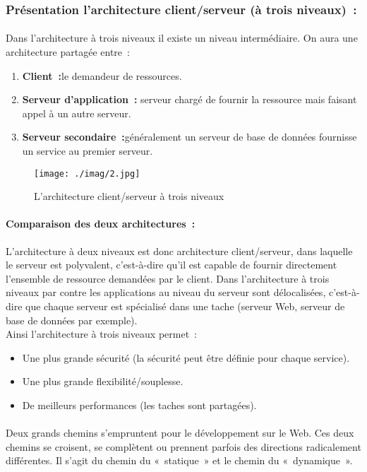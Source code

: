 \subsubsection{Présentation l’architecture client/serveur (à trois niveaux) :}
\paragraph{}
Dans l’architecture à trois niveaux il existe un niveau intermédiaire. On aura une architecture partagée entre : 

\begin{enumerate}
	\item \textbf{Client :}le demandeur de ressources.
	\item \textbf{Serveur d’application :} serveur chargé de fournir la ressource mais faisant appel à un autre serveur.
	\item \textbf{Serveur secondaire :}généralement un serveur de base de données fournisse un service au premier serveur.
\end{enumerate}
\begin{figure}[h]
	\centering
	\texttt{[image: ./imag/2.jpg]}
	\caption{L’architecture client/serveur à trois niveaux}
\end{figure}
\paragraph{Comparaison des deux architectures :}
L’architecture à deux niveaux est donc architecture client/serveur, dans laquelle le serveur est polyvalent, c’est-à-dire qu’il est capable de fournir directement l’ensemble de ressource demandées par le client. Dans l’architecture à trois niveaux par contre les applications au niveau du serveur sont délocalisées, c’est-à-dire que chaque serveur est spécialisé dans une tache (serveur Web, serveur de base de données par exemple).\\
Ainsi l’architecture à trois niveaux permet :
\begin{itemize}
	\item Une plus grande sécurité (la sécurité peut être définie pour chaque service).
	\item Une plus grande flexibilité/souplesse.
	\item De meilleurs performances (les taches sont partagées).
\end{itemize}
\paragraph{}
Deux grands chemins s’empruntent pour le développement sur le Web. Ces deux chemins se croisent, se complètent ou prennent parfois des directions radicalement différentes. Il s’agit du chemin du « statique » et le chemin du « dynamique ».
